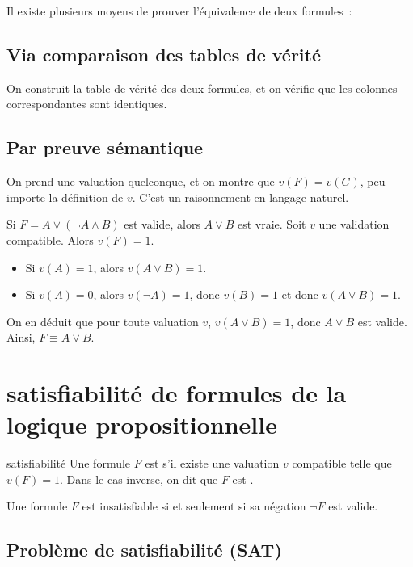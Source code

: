 Il existe plusieurs moyens de prouver l'équivalence de deux formules~:
\subsection{Via comparaison des tables de vérité}
    On construit la table de vérité des deux formules, et on vérifie que les colonnes correspondantes sont identiques.
\subsection{Par preuve sémantique}
    On prend une valuation quelconque, et on montre que $v(F) = v(G)$, peu importe la définition de $v$. C'est un raisonnement en langage naturel.
    \begin{exemple}{}{}
        Si $F = A \lor (\neg A \land B)$ est valide, alors $A\lor B$ est vraie. Soit $v$ une validation compatible. Alors $v(F) = 1$.
        \begin{itemize}
            \item Si $v(A) = 1$, alors $v(A \lor B) = 1$.
            \item Si $v(A) = 0$, alors $v(\neg A) = 1$, donc $v(B) = 1$ et donc $v(A \lor B) = 1$.
        \end{itemize}
        On en déduit que pour toute valuation $v$, $v(A \lor B) = 1$, donc $A \lor B$ est valide. Ainsi, $F \equiv A \lor B$.
    \end{exemple}

\section{satisfiabilité de formules de la logique propositionnelle}


\begin{definition}{}{satisfiabilité}
    Une formule $F$ est  s'il existe une valuation $v$ compatible telle que $v(F) = 1$. Dans le cas inverse, on dit que $F$ est .
\end{definition}

\begin{theoreme}{}{}
    Une formule $F$ est insatisfiable si et seulement si sa négation $\neg F$ est valide.
\end{theoreme}

\subsection{Problème de satisfiabilité (SAT)}

